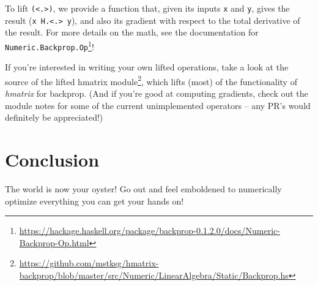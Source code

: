 \documentclass[]{article}
\newenvironment{Shaded}{}{}
\newcommand{\DataTypeTok}[1]{\textcolor[rgb]{0.56,0.13,0.00}{#1}}
\newcommand{\DecValTok}[1]{\textcolor[rgb]{0.25,0.63,0.44}{#1}}
\newcommand{\KeywordTok}[1]{\textcolor[rgb]{0.00,0.44,0.13}{\textbf{#1}}}
\newcommand{\NormalTok}[1]{#1}
\newcommand{\OperatorTok}[1]{\textcolor[rgb]{0.40,0.40,0.40}{#1}}
\newcommand{\OtherTok}[1]{\textcolor[rgb]{0.00,0.44,0.13}{#1}}
\renewcommand{\href}[2]{#2\footnote{\url{#1}}}
\begin{document}
\begin{Shaded}
\end{Shaded}

To lift \texttt{(\textless{}.\textgreater{})}, we provide a function that, given
its inputs \texttt{x} and \texttt{y}, gives the result
(\texttt{x\ H.\textless{}.\textgreater{}\ y}), and also its gradient with
respect to the total derivative of the result. For more details on the math, see
the
\href{https://hackage.haskell.org/package/backprop-0.1.2.0/docs/Numeric-Backprop-Op.html}{documentation
for \texttt{Numeric.Backprop.Op}}!

If you're interested in writing your own lifted operations, take a look at the
\href{https://github.com/mstksg/hmatrix-backprop/blob/master/src/Numeric/LinearAlgebra/Static/Backprop.hs}{source
of the lifted hmatrix module}, which lifts (most) of the functionality of
\emph{hmatrix} for backprop. (And if you're good at computing gradients, check
out the module notes for some of the current unimplemented operators -- any PR's
would definitely be appreciated!)

\section{Conclusion}\label{conclusion}

The world is now your oyster! Go out and feel emboldened to numerically optimize
everything you can get your hands on!
\end{document}
